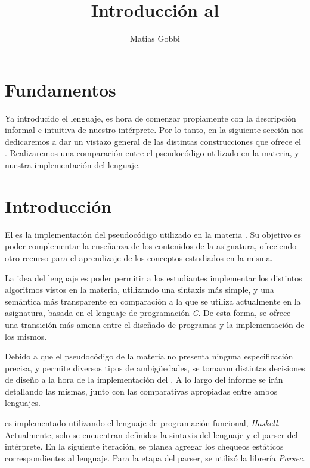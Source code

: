 \documentclass{article}
\begin{document}
\title{Introducción al \Lang}
\author{Matias Gobbi}
\maketitle

\section*{Fundamentos}

Ya introducido el lenguaje, es hora de comenzar propiamente con la descripción informal e intuitiva de nuestro intérprete.
Por lo tanto, en la siguiente sección nos dedicaremos a dar un vistazo general de las distintas construcciones que ofrece el \Lang.
Realizaremos una comparación entre el pseudocódigo utilizado en la materia, y nuestra implementación del lenguaje.

\section{Introducción}

El \Lang\space es la implementación del pseudocódigo utilizado en la materia \Mat.
Su objetivo es poder complementar la enseñanza de los contenidos de la asignatura, ofreciendo otro recurso para el aprendizaje de los conceptos estudiados en la misma.

La idea del lenguaje es poder permitir a los estudiantes implementar los distintos algoritmos vistos en la materia, utilizando una sintaxis más simple, y una semántica más transparente en comparación a la que se utiliza actualmente en la asignatura, basada en el lenguaje de programación \textit{C}.
De esta forma, se ofrece una transición más amena entre el diseñado de programas y la implementación de los mismos.

Debido a que el pseudocódigo de la materia no presenta ninguna especificación precisa, y permite diversos tipos de ambigüedades, se tomaron distintas decisiones de diseño a la hora de la implementación del \Lang.
A lo largo del informe se irán detallando las mismas, junto con las comparativas apropiadas entre ambos lenguajes. 

\Lang\space es implementado utilizando el lenguaje de programación funcional, \textit{Haskell}.
Actualmente, solo se encuentran definidas la sintaxis del lenguaje y el parser del intérprete.
En la siguiente iteración, se planea agregar los chequeos estáticos correspondientes al lenguaje.
Para la etapa del parser, se utilizó la librería \textit{Parsec}.
\end{document}
